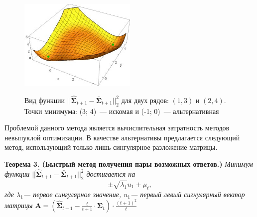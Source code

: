 \documentclass{article}
\begin{document}
\begin{figure}[H]
	\centering
	\begin{center}
		\includegraphics[width=0.5\textwidth]{CorrelationError}
		\label{fig:fig5}
	\end{center}
	\caption{Вид функции $||\hat{\mathbf{\Sigma}}_{t+1} - \bar{\mathbf{\Sigma}}_{t+1}||_2^2$ для двух рядов: $(1, 3)$ и $(2, 4)$. Точки минимума: (3; 4)~--- искомая и (-1; 0)~--- альтернативная}
\end{figure}


Проблемой данного метода является вычислительная затратность методов невыпуклой оптимизации. В качестве альтернативы предлагается следующий метод, использующий только лишь сингулярное разложение матрицы.

\textbf{Теорема 3. (Быстрый метод получения пары возможных ответов.)} \textit{Минимум функции $||\hat{\mathbf{\Sigma}}_{t+1} - \bar{\mathbf{\Sigma}}_{t+1}||_2^2$ достигается на \[\pm\sqrt{\lambda_1} u_1 + \mu_t,\] где $\lambda_1$--- первое сингулярное значение, $u_1$--- первый левый сигнулярный вектор матрицы $\mathbf{A}=\left(\hat{\mathbf{\Sigma}}_{t+1} - \frac{t}{t+1} \cdot \mathbf{\Sigma}_t \right) \cdot \frac{(t+1)^2}{t}$}
\end{document}
